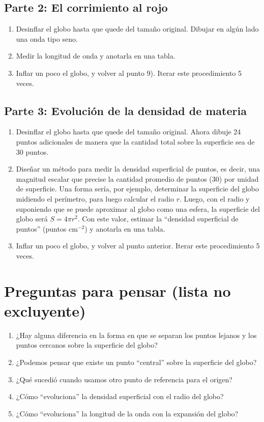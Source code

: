 \documentclass[a4paper,12pt]{article}
\begin{document}
\subsection*{Parte 2: El corrimiento al rojo}
\begin{enumerate}
	\item Desinflar el globo hasta que quede del tamaño original. Dibujar en
		algún lado una onda tipo seno.
	\item Medir la longitud de onda y anotarla en una tabla.
	\item Inflar un poco el globo, y volver al punto 9). Iterar este
		procedimiento 5 veces.
\end{enumerate}

\subsection*{Parte 3: Evolución de la densidad de materia}
\begin{enumerate}
	\item Desinflar el globo hasta que quede del tamaño original. Ahora dibuje
		24 puntos adicionales de manera que la cantidad total sobre la
		superficie sea de 30 puntos. 
	\item Diseñar un método para medir la densidad superficial de puntos, es
		decir, una magnitud escalar que precise la cantidad promedio de puntos
		(30) por unidad de superficie. Una forma sería, por ejemplo, determinar
		la superficie del globo midiendo el perímetro, para luego calcular el
		radio $r$. Luego, con el radio y suponiendo que se puede aproximar al
		globo como una esfera, la superficie del globo será $S=4 \pi r^2$. Con
		este valor, estimar la ``densidad superficial de puntos'' (puntos
		cm$^{-2}$) y anotarla en una tabla.
	\item Inflar un poco el globo, y volver al punto anterior. Iterar este
		procedimiento 5 veces.
\end{enumerate}

\section*{Preguntas para pensar (lista no excluyente)}
\begin{enumerate}
	\item ¿Hay alguna diferencia en la forma en que se separan los puntos
		lejanos y los puntos cercanos sobre la superficie del globo?  
	\item ¿Podemos pensar que existe un punto ``central'' sobre la superficie
		del globo?
	\item ¿Qué sucedió cuando usamos otro punto de referencia para el origen?
	\item ¿Cómo ``evoluciona'' la densidad superficial con el radio del globo?
	\item ¿Cómo ``evoluciona'' la longitud de la onda con la expansión del
		globo?
\end{enumerate}
\end{document}
